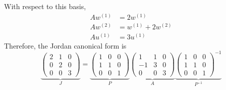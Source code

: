 \begin{example}
		With respect to this basis,
		\begin{align}
			A w^{(1)} &= 2 w^{(1)} \\
			A w^{(2)} &= w^{(1)} + 2w^{(2)} \\
			A u^{(1)} &= 3u^{(1)}
		\end{align}
		Therefore, the Jordan canonical form is
		\begin{equation}
			\underbrace{\begin{pmatrix} 2 & 1 & 0 \\ 0 & 2 & 0 \\ 0 & 0 & 3 \end{pmatrix}}_{J}
			= \underbrace{\begin{pmatrix} 1 & 0 & 0 \\ 1 & 1 & 0 \\ 0 & 0 & 1 \end{pmatrix} }_{P}
			\underbrace{\begin{pmatrix} 1 & 1 & 0 \\ -1 & 3 & 0 \\ 0 & 0 & 3 \end{pmatrix}}_{A}
			\underbrace{\begin{pmatrix} 1 & 0 & 0 \\ 1 & 1 & 0 \\ 0 & 0 & 1 \end{pmatrix}^{-1}}_{P^{-1}}
		\end{equation}
	\end{example}

